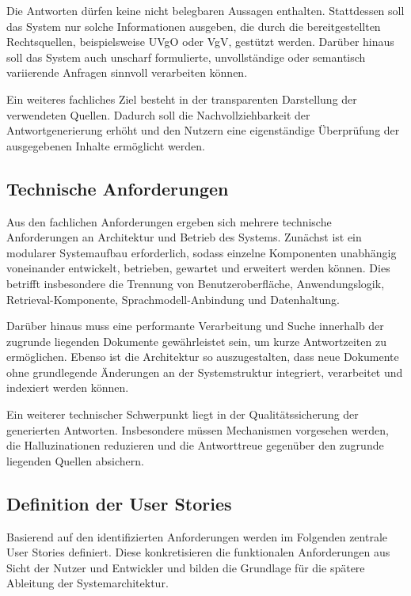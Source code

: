 Die Antworten dürfen keine nicht belegbaren Aussagen enthalten. Stattdessen soll das System nur solche Informationen ausgeben, die durch die bereitgestellten Rechtsquellen, beispielsweise UVgO oder VgV, gestützt werden. Darüber hinaus soll das System auch unscharf formulierte, unvollständige oder semantisch variierende Anfragen sinnvoll verarbeiten können.

Ein weiteres fachliches Ziel besteht in der transparenten Darstellung der verwendeten Quellen. Dadurch soll die Nachvollziehbarkeit der Antwortgenerierung erhöht und den Nutzern eine eigenständige Überprüfung der ausgegebenen Inhalte ermöglicht werden.

\subsection{Technische Anforderungen}

Aus den fachlichen Anforderungen ergeben sich mehrere technische Anforderungen an Architektur und Betrieb des Systems. Zunächst ist ein modularer Systemaufbau erforderlich, sodass einzelne Komponenten unabhängig voneinander entwickelt, betrieben, gewartet und erweitert werden können. Dies betrifft insbesondere die Trennung von Benutzeroberfläche, Anwendungslogik, Retrieval-Komponente, Sprachmodell-Anbindung und Datenhaltung.

Darüber hinaus muss eine performante Verarbeitung und Suche innerhalb der zugrunde liegenden Dokumente gewährleistet sein, um kurze Antwortzeiten zu ermöglichen. Ebenso ist die Architektur so auszugestalten, dass neue Dokumente ohne grundlegende Änderungen an der Systemstruktur integriert, verarbeitet und indexiert werden können.

Ein weiterer technischer Schwerpunkt liegt in der Qualitätssicherung der generierten Antworten. Insbesondere müssen Mechanismen vorgesehen werden, die Halluzinationen reduzieren und die Antworttreue gegenüber den zugrunde liegenden Quellen absichern.

\subsection{Definition der User Stories}

Basierend auf den identifizierten Anforderungen werden im Folgenden zentrale User Stories definiert. Diese konkretisieren die funktionalen Anforderungen aus Sicht der Nutzer und Entwickler und bilden die Grundlage für die spätere Ableitung der Systemarchitektur.

